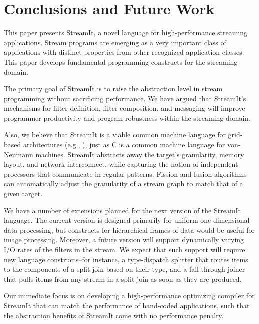 \section{Conclusions and Future Work}
\label{sec:conc}

This paper presents StreamIt, a novel language for high-performance
streaming applications.  Stream programs are emerging as a very
important class of applications with distinct properties from other
recognized application classes.  This paper develops fundamental
programming constructs for the streaming domain.

The primary goal of StreamIt is to raise the abstraction level in
stream programming without sacrificing performance.  We have argued
that StreamIt's mechanisms for filter definition, filter composition,
and messaging will improve programmer productivity and program
robustness within the streaming domain.

Also, we believe that StreamIt is a viable common machine language for
grid-based architectures (e.g., \cite{smartmemories,rawshort,trips}),
just as C is a common machine language for von-Neumann machines.
StreamIt abstracts away the target's granularity, memory layout, and
network interconnect, while capturing the notion of independent
processors that communicate in regular patterns.  Fission and fusion
algorithms can automatically adjust the granularity of a stream graph
to match that of a given target.

We have a number of extensions planned for the next version of the
StreamIt language.  The current version is designed primarily for
uniform one-dimensional data processing, but constructs for hierarchical
frames of data would be useful for image processing.  Moreover, a future
version will support dynamically varying I/O rates of the filters in the
stream.  We expect that such support will require new language
constructs--for instance, a type-dispatch splitter that routes items to
the components of a split-join based on their type, and a fall-through
joiner that pulls items from any stream in a split-join as soon as they
are produced.

Our  immediate focus  is on  developing a  high-performance optimizing
compiler  for StreamIt that  can match  the performance  of hand-coded
applications, such that the abstraction benefits of StreamIt come with
no performance penalty.


